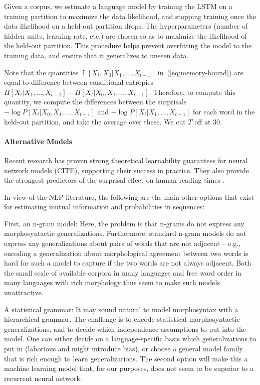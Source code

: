 \documentclass[11pt,letterpaper]{article}
\begin{document}
Given a corpus, we estimate a language model by training the LSTM on a training partition to maximize the data likelihood, and stopping training once the data likelihood on a held-out partition drops.
The hyperparameters (number of hidden units, learning rate, etc.) are chosen so as to maximize the likelihood of the held-out partition.
This procedure helps prevent overfitting the model to the training data, and ensure that it generalizes to unseen data. 

Note that the quantities $\operatorname{I}[X_t, X_0 | X_1, ..., X_{t-1}]$ in~(\ref{eq:memory-bound}) are equal to difference between conditional entropies $H[X_t|X_1, ..., X_{t-1}] - H[X_t|X_0, X_1, ..., X_{t-1}]$.
Therefore, to compute this quantity, we compute the differences between the surprisals
$-\log P[X_t | X_0, X_1, ..., X_{t-1}]$ and $-\log P[X_t | X_1, ..., X_{t-1}]$ for each word in the held-out partition, and take the average over these.
We cut $T$ off at 30.


\paragraph{Alternative Models}
Recent research has proven strong theoretical learnability guarantees for neural network models (CITE), supporting their success in practice.
They also provide the strongest predictors of the surprisal effect on human reading times \citep{frank-insensitivity-2011, goodkind-predictive-2018}.

In view of the NLP literature, the following are the main other options that exist for estimating mutual information and probabilities in sequences:

First, an n-gram model: Here, the problem is that n-grams do not express any morphosyntactic generalizations. Furthermore, standard n-gram models do not express any generalizations about pairs of words that are not adjacent -- e.g., encoding a generalization about morphological agreement between two words is hard for such a model to capture if the two words are not always adjacent. Both the small scale of available corpora in many languages and free word order in many languages with rich morphology thus seem to make such models unattractive.

A statistical grammar: It may sound natural to model morphosyntax with a hierarchical grammar. The challenge is to encode statistical morphosyntactic generalizations, and to decide which independence assumptions to put into the model. One can either decide on a language-specific basis which generalizations to put in (laborious and might introduce bias), or choose a general model family that is rich enough to learn generalizations. The second option will make this a machine learning model that, for our purposes, does not seem to be superior to a recurrent neural network.
\end{document}
